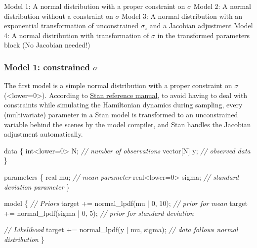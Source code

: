 \documentclass[
  letterpaper,
  DIV=11,
  numbers=noendperiod]{scrartcl}
\newenvironment{Shaded}{}{}
\newcommand{\CommentTok}[1]{\textcolor[rgb]{0.63,0.63,0.65}{\textit{#1}}}
\newcommand{\DataTypeTok}[1]{\textcolor[rgb]{0.65,0.15,0.64}{#1}}
\newcommand{\DecValTok}[1]{\textcolor[rgb]{0.60,0.41,0.00}{#1}}
\newcommand{\KeywordTok}[1]{\textcolor[rgb]{0.65,0.15,0.64}{#1}}
\newcommand{\NormalTok}[1]{\textcolor[rgb]{0.22,0.23,0.26}{#1}}
\begin{document}
Model 1: A normal distribution with a proper constraint on \(\sigma\)
Model 2: A normal distribution without a constraint on \(\sigma\) Model
3: A normal distribution with an exponential transformation of
unconstrained \(\sigma_z\) and a Jacobian adjustment Model 4: A normal
distribution with transformation of \(\sigma\) in the transformed
parameters block (No Jacobian needed!)

\subsubsection{\texorpdfstring{Model 1: constrained
\(\sigma\)}{Model 1: constrained \textbackslash sigma}}\label{model-1-constrained-sigma}

The first model is a simple normal distribution with a proper constraint
on \(\sigma\) (\textless lower=0\textgreater). According to
\href{https://mc-stan.org/docs/reference-manual/transforms.html}{Stan
reference manual}, to avoid having to deal with constraints while
simulating the Hamiltonian dynamics during sampling, every
(multivariate) parameter in a Stan model is transformed to an
unconstrained variable behind the scenes by the model compiler, and Stan
handles the Jacobian adjustment automatically.

\begin{Shaded}
\begin{Highlighting}[]
\KeywordTok{data}\NormalTok{ \{}
  \DataTypeTok{int}\NormalTok{\textless{}}\KeywordTok{lower}\NormalTok{=}\DecValTok{0}\NormalTok{\textgreater{} N; }\CommentTok{// number of observations}
  \DataTypeTok{vector}\NormalTok{[N] y; }\CommentTok{// observed data}
\NormalTok{\}}

\KeywordTok{parameters}\NormalTok{ \{}
  \DataTypeTok{real}\NormalTok{ mu; }\CommentTok{// mean parameter}
  \DataTypeTok{real}\NormalTok{\textless{}}\KeywordTok{lower}\NormalTok{=}\DecValTok{0}\NormalTok{\textgreater{} sigma; }\CommentTok{// standard deviation parameter}
\NormalTok{\}}

\KeywordTok{model}\NormalTok{ \{}
  \CommentTok{// Priors}
  \KeywordTok{target +=}\NormalTok{ normal\_lpdf(mu | }\DecValTok{0}\NormalTok{, }\DecValTok{10}\NormalTok{); }\CommentTok{// prior for mean}
  \KeywordTok{target +=}\NormalTok{ normal\_lpdf(sigma | }\DecValTok{0}\NormalTok{, }\DecValTok{5}\NormalTok{); }\CommentTok{// prior for standard deviation}
  
  \CommentTok{// Likelihood}
  \KeywordTok{target +=}\NormalTok{ normal\_lpdf(y | mu, sigma); }\CommentTok{// data follows normal distribution}
\NormalTok{\}}
\end{Highlighting}
\end{Shaded}
\end{document}
